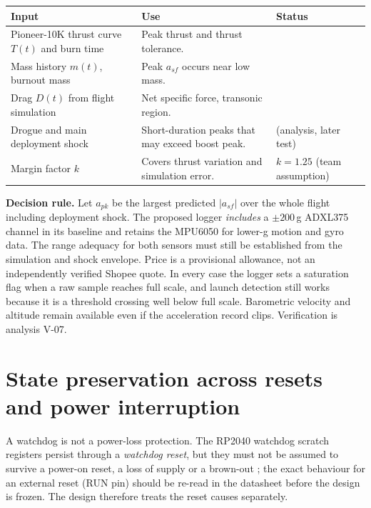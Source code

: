 \small
{}
\begin{tabularx}{\linewidth}{@{}L{42mm}Y L{34mm}@{}}
\toprule{}\textbf{Input}&\textbf{Use}&\textbf{Status}\\\midrule
Pioneer-10K thrust curve $T(t)$ and burn time & Peak thrust and thrust tolerance. & \\
Mass history $m(t)$, burnout mass & Peak $a_{sf}$ occurs near low mass. & \\
Drag $D(t)$ from flight simulation & Net specific force, transonic region. & \\
Drogue and main deployment shock & Short-duration peaks that may exceed boost peak. &  (analysis, later test)\\
Margin factor $k$ & Covers thrust variation and simulation error. & $k=1.25$ (team assumption)\\
\bottomrule
\end{tabularx}
\normalsize

\textbf{Decision rule.} Let $a_{pk}$ be the largest predicted $|a_{sf}|$ over the whole flight including deployment shock. The proposed logger \emph{includes} a $\pm200$\,g ADXL375 channel in its baseline and retains the MPU6050 for lower-g motion and gyro data. The range adequacy for both sensors must still be established from the simulation and shock envelope. Price is a provisional allowance, not an independently verified Shopee quote. In every case the logger sets a saturation flag when a raw sample reaches full scale, and launch detection still works because it is a threshold crossing well below full scale. Barometric velocity and altitude remain available even if the acceleration record clips. Verification is analysis V-07.

\section{State preservation across resets and power interruption}
\label{sec:state}
A watchdog is not a power-loss protection. The RP2040 watchdog scratch registers persist through a \emph{watchdog reset}, but they must not be assumed to survive a power-on reset, a loss of supply or a brown-out \cite{rp2040ds}; the exact behaviour for an external reset (RUN pin) should be re-read in the datasheet before the design is frozen. The design therefore treats the reset causes separately.


